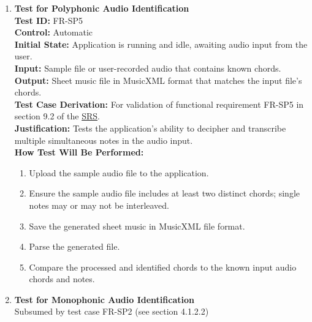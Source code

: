 \documentclass[12pt, titlepage]{article}
\begin{document}
\begin{enumerate}
    \item \textbf{Test for Polyphonic Audio Identification} \\
      \newline
      \textbf{Test ID:} FR-SP5 \\
      \textbf{Control:} Automatic \\
      \textbf{Initial State:} Application is running and idle, awaiting audio input from the user. \\
      \textbf{Input:} Sample file or user-recorded audio that contains known chords. \\
      \textbf{Output:} Sheet music file in MusicXML format that matches the input file’s chords. \\
      \textbf{Test Case Derivation:} For validation of functional requirement FR-SP5 in section 9.2 of the 
      \href{https://github.com/emilyperica/ScoreGen/blob/main/docs/SRS-Volere/SRS.pdf}{SRS}. \\
      \textbf{Justification:} Tests the application's ability to decipher and transcribe multiple simultaneous notes
      in the audio input. \\
      \textbf{How Test Will Be Performed:}
      \begin{enumerate}
          \item Upload the sample audio file to the application.
          \item Ensure the sample audio file includes at least two distinct chords; single notes may or may not be interleaved.
          \item Save the generated sheet music in MusicXML file format.
          \item Parse the generated file.
          \item Compare the processed and identified chords to the known input audio chords and notes.
      \end{enumerate}
    \item \textbf{Test for Monophonic Audio Identification} \\
    Subsumed by test case FR-SP2 (see section 4.1.2.2)
  \end{enumerate}
\end{document}
